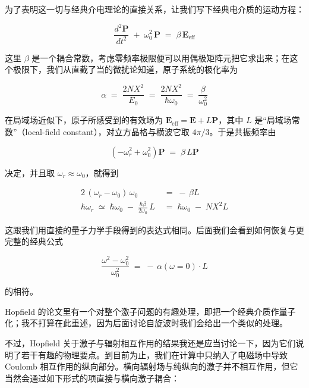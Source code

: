 为了表明这一切与经典介电理论的直接关系，让我们写下经典电介质的运动方程：

\begin{equation*}
\frac{d^{2}\mathbf{P}}{dt^{2}} \;+\; \omega_0^{2}\,\mathbf{P} \;=\; \beta\, \mathbf{E}_{\mathrm{eff}}
\end{equation*}

这里 $\beta$ 是一个耦合常数，考虑零频率极限便可以用偶极矩阵元把它求出来；在这个极限下，我们从直截了当的微扰论知道，原子系统的极化率为

\begin{equation*}
\alpha \;=\; \frac{2 N X^{2}}{E_0} \;=\; \frac{2 N X^{2}}{\hbar\omega_0} \;=\; \frac{\beta}{\omega_0^{2}}
\end{equation*}

在局域场近似下，原子所感受到的有效场为 $\mathbf{E}_{\mathrm{eff}} = \mathbf{E} + L\mathbf{P}$，其中 $L$ 是“局域场常数”（local-field constant），对立方晶格与横波它取 $4\pi/3$。于是共振频率由

\begin{equation*}
\left(-\omega_r^{2} + \omega_0^{2}\right)\mathbf{P} \;=\; \beta\, L\mathbf{P}
\end{equation*}

决定，并且取 $\omega_r \approx \omega_0$，就得到

\begin{align*}
2\,(\omega_r - \omega_0)\,\omega_0 \;&=\; -\,\beta L \\
\hbar\omega_r \;\simeq\; \hbar\omega_0 \;-\; \frac{\hbar\beta}{2\omega_0}\, L \;&=\; \hbar\omega_0 \;-\; N X^{2} L
\end{align*}

这跟我们用直接的量子力学手段得到的表达式相同。后面我们会看到如何恢复与更完整的经典公式

\begin{equation*}
\frac{\omega^{2} - \omega_0^{2}}{\omega_0^{2}} \;=\; -\,\alpha(\omega{=}0)\cdot L \tag{15'}
\end{equation*}

的相符。

Hopfield 的论文里有一个对整个激子问题的有趣处理，即把一个经典介质作量子化；我不打算在此重述，因为后面讨论自旋波时我们会给出一个类似的处理。

不过，Hopfield 关于激子与辐射相互作用的结果我还是应当讨论一下，因为它们说明了若干有趣的物理要点。到目前为止，我们在计算中只纳入了电磁场中导致 Coulomb 相互作用的纵向部分。横向辐射场与纯纵向的激子并不相互作用，但它当然会通过如下形式的项直接与横向激子耦合：

